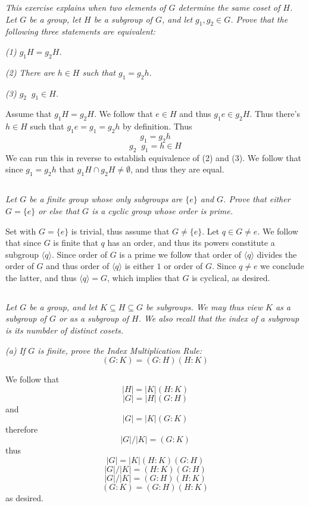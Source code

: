 \documentclass[11pt,oneside,titlepage]{book}
\DeclareMathOperator \inv {^{-1}}
\newcommand{\eangle}[1]{\langle #1 \rangle}
\newcommand{\set}[1]{\{ #1 \}}
\begin{document}
\textit{This exercise explains when two elements of $G$ determine the
same coset of $H$. Let $G$ be a group, let $H$ be a subgroup of $G$,
and let $g_1, g_2 \in G$. Prove that the following three statements
are equivalent:}

\textit{(1) $g_1 H = g_2 H$. }

\textit{(2) There are $h \in H$ such that $g_1 = g_2 h$. }

\textit{(3) $g_2\inv g_1 \in H$. }

Assume that $g_1 H = g_2 H$. We follow that $e \in H$ and thus $g_1 e
\in g_2 H$. Thus there's $h \in H$ such that $g_1 e = g_1 = g_2 h$ by
definition. Thus
$$g_1 = g_2 h$$
$$g_2 \inv g_1 = h \in H$$
We can run this in reverse to establish equivalence of (2) and (3).
We follow that since $g_1 = g_2 h$ that $g_1 H \cap g_2 H \neq
\emptyset$, and thus they are equal.

\subsection{}

\textit{Let $G$ be a finite group whose only subgroups are $\set{e}$
and $G$.  Prove that either $G = \set{e}$ or else that $G$ is a cyclic
group whose order is prime.}

Set with $G = \set{e}$ is trivial, thus assume that $G \neq \set{e}$.
Let $q \in G \neq e$. We follow that since $G$ is finite that $q$ has
an order, and thus its powers constitute a subgroup
$\eangle{q}$. Since order of $G$ is a prime we follow that order of
$\eangle{q}$ divides the order of $G$ and thus order of $\eangle{q}$
is either $1$ or order of $G$. Since $q \neq e$ we conclude the
latter, and thus $\eangle{q} = G$, which implies that $G$ is cyclical,
as desired.

\subsection{}

\textit{Let $G$ be a group, and let $K \subseteq H \subseteq G$ be
subgroups. We may thus view $K$ as a subgroup of $G$ or as a subgroup
of $H$. We also recall that the index of a subgroup is its numbder of
distinct cosets. }

\textit{(a) If $G$ is finite, prove the Index Multiplication Rule:
  $$(G:K) = (G:H) (H:K)$$
}

We follow that
$$|H| = |K| (H:K)$$
$$|G| = |H| (G:H)$$
and
$$|G| = |K| (G:K)$$
therefore
$$|G| / |K| =  (G:K)$$
thus
$$|G| = |K| (H:K) (G:H)$$
$$|G| / |K| =  (H:K) (G:H)$$
$$|G| / |K| =  (G:H) (H:K) $$
$$(G:K) =  (G:H) (H:K) $$
as desired.
\end{document}
